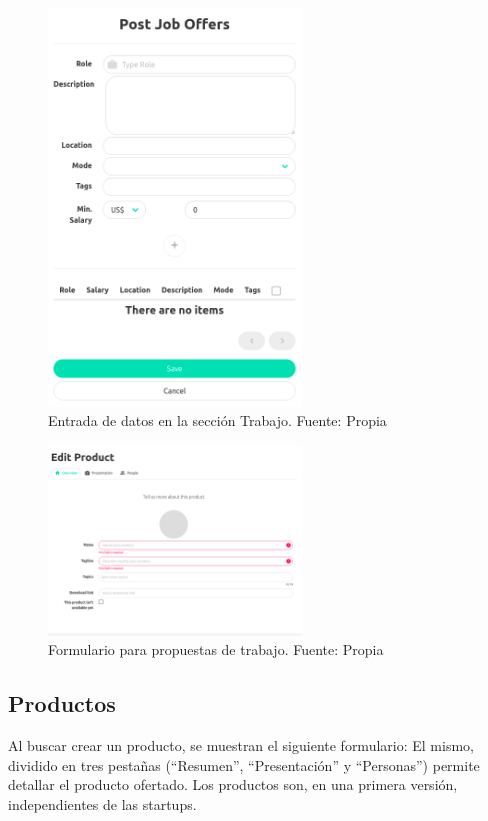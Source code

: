 \begin{figure}[H]
\centering
\includegraphics[width=0.60\textwidth]{img/45.png}
\caption{Entrada de datos en la sección Trabajo. Fuente: Propia}
\label{figure:startupWork}
\end{figure}


\begin{figure}[H]
\centering
\includegraphics[width=0.60\textwidth]{img/46.png}
\caption{Formulario para propuestas de trabajo. Fuente: Propia}
\label{figure:startupWorkForm}
\end{figure}

\subsection{Productos}

Al buscar crear un producto, se muestran el siguiente formulario:
El mismo, dividido en tres pestañas (“Resumen”, “Presentación” y “Personas”) permite detallar el producto ofertado. Los productos son, en una primera versión, independientes de las startups.

